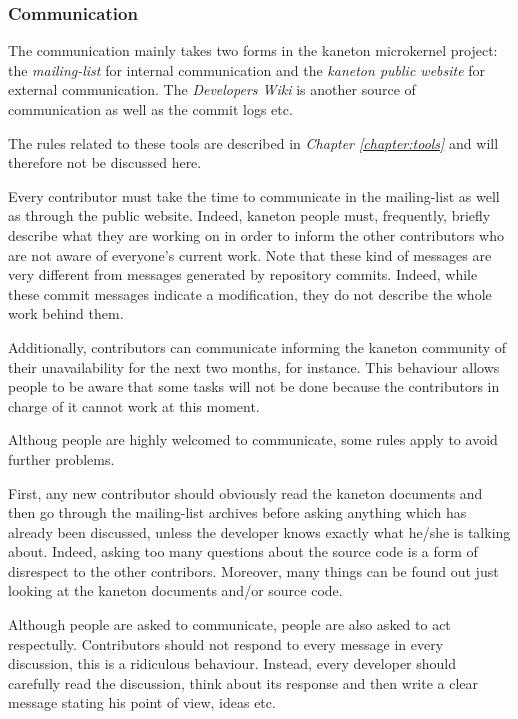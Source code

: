
\subsubsection{Communication}

The communication mainly takes two forms in the kaneton microkernel project:
the \textit{mailing-list} for internal communication and the \textit{kaneton
public website} for external communication. The \textit{Developers Wiki}
is another source of communication as well as the commit logs etc.

The rules related to these tools are described in \textit{Chapter
\ref{chapter:tools}} and will therefore not be discussed here.

Every contributor must take the time to communicate in the mailing-list as well
as through the public website. Indeed, kaneton people must, frequently,
briefly describe what they are working on in order to inform the other
contributors who are not aware of everyone's current work. Note that these
kind of messages are very different from messages generated by repository
commits. Indeed, while these commit messages indicate a modification, they
do not describe the whole work behind them.

Additionally, contributors can communicate informing the kaneton community of
their unavailability for the next two months, for instance. This behaviour
allows people to be aware that some tasks will not be done because the
contributors in charge of it cannot work at this moment.

Althoug people are highly welcomed to communicate, some rules apply to
avoid further problems.

First, any new contributor should obviously read the kaneton documents and
then go through the mailing-list archives before asking anything which has
already been discussed, unless the developer knows exactly what he/she is
talking about. Indeed, asking too many questions about the source code is a
form of disrespect to the other contribors. Moreover, many things can be
found out just looking at the kaneton documents and/or source code.

Although people are asked to communicate, people are also asked to act
respectully. Contributors should not respond to every message in every
discussion, this is a ridiculous behaviour. Instead, every developer should
carefully read the discussion, think about its response and then write a clear
message stating his point of view, ideas etc.

